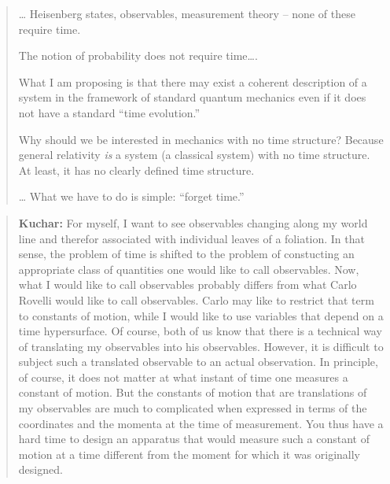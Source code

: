 \documentclass[12pt]{article}
\begin{document}
\begin{quote}
\ldots{} Heisenberg states, observables, measurement theory -- none of
these require time.

The notion of probability does not require time\ldots.

What I am proposing is that there may exist a coherent description of a
system in the framework of standard quantum mechanics even if it does
not have a standard ``time evolution.''

Why should we be interested in mechanics with no time structure? Because
general relativity \emph{is} a system (a classical system) with no time
structure. At least, it has no clearly defined time structure.

\ldots{} What we have to do is simple: ``forget time.''
\end{quote}

\begin{quote}
\textbf{Kuchar:} For myself, I want to see observables changing along my
world line and therefor associated with individual leaves of a
foliation. In that sense, the problem of time is shifted to the problem
of constucting an appropriate class of quantities one would like to call
observables. Now, what I would like to call observables probably differs
from what Carlo Rovelli would like to call observables. Carlo may like
to restrict that term to constants of motion, while I would like to use
variables that depend on a time hypersurface. Of course, both of us know
that there is a technical way of translating my observables into his
observables. However, it is difficult to subject such a translated
observable to an actual observation. In principle, of course, it does
not matter at what instant of time one measures a constant of motion.
But the constants of motion that are translations of my observables are
much to complicated when expressed in terms of the coordinates and the
momenta at the time of measurement. You thus have a hard time to design
an apparatus that would measure such a constant of motion at a time
different from the moment for which it was originally designed.
\end{quote}
\end{document}
